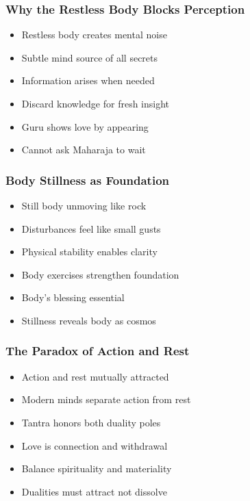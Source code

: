 \begin{frame}[fragile]\frametitle{Why the Restless Body Blocks Perception}
  \begin{itemize}
    \item Restless body creates mental noise
    \item Subtle mind source of all secrets
    \item Information arises when needed
    \item Discard knowledge for fresh insight
    \item Guru shows love by appearing
    \item Cannot ask Maharaja to wait
  \end{itemize}
\end{frame}

\begin{frame}[fragile]\frametitle{Body Stillness as Foundation}
  \begin{itemize}
    \item Still body unmoving like rock
    \item Disturbances feel like small gusts
    \item Physical stability enables clarity
    \item Body exercises strengthen foundation
    \item Body's blessing essential
    \item Stillness reveals body as cosmos
  \end{itemize}
\end{frame}

\begin{frame}[fragile]\frametitle{The Paradox of Action and Rest}
  \begin{itemize}
    \item Action and rest mutually attracted
    \item Modern minds separate action from rest
    \item Tantra honors both duality poles
    \item Love is connection and withdrawal
    \item Balance spirituality and materiality
    \item Dualities must attract not dissolve
  \end{itemize}
\end{frame}

